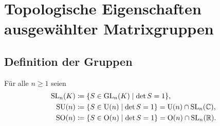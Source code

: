 \section{Topologische Eigenschaften ausgewählter Matrixgruppen}










\subsection{Definition der Gruppen}


\begin{definition}
  Für alle $n \geq 1$ seien
  \begin{align*}
    \mathrm{SL}_n(K)
    &\coloneqq
    \{ S \in \mathrm{GL}_n(K) \mid \det S = 1 \},
    \\
    \mathrm{SU}(n)
    &\coloneqq
    \{ S \in \mathrm{U}(n) \mid \det S = 1 \}
    = \mathrm{U}(n) \cap \mathrm{SL}_n(\mathbb{C}),
    \\
    \mathrm{SO}(n)
    &\coloneqq
    \{ S \in \mathrm{O}(n) \mid \det S = 1 \}
    = \mathrm{O}(n) \cap \mathrm{SL}_n(\mathbb{R}).
  \end{align*}
\end{definition}


